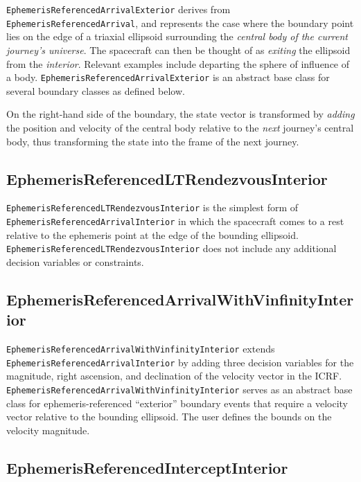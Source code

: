 \texttt{EphemerisReferencedArrivalExterior} derives from \texttt{EphemerisReferencedArrival}, and represents the case where the boundary point lies on the edge of a triaxial ellipsoid surrounding the \textit{central body of the current journey's universe}. The spacecraft can then be thought of as \textit{exiting} the ellipsoid from the \textit{interior}. Relevant examples include departing the sphere of influence of a body. \texttt{EphemerisReferencedArrivalExterior} is an abstract base class for several boundary classes as defined below.

On the right-hand side of the boundary, the state vector is transformed by \textit{adding} the position and velocity of the central body relative to the \textit{next} journey's central body, thus transforming the state into the frame of the next journey.

\subsection{EphemerisReferencedLTRendezvousInterior}
\label{subsubsec:EphemerisReferencedLTRendezvousInterior}

\texttt{EphemerisReferencedLTRendezvousInterior} is the simplest form of \texttt{EphemerisReferencedArrivalInterior} in which the spacecraft comes to a rest relative to the ephemeris point at the edge of the bounding ellipsoid. \texttt{EphemerisReferencedLTRendezvousInterior} does not include any additional decision variables or constraints.

\subsection{EphemerisReferencedArrivalWithVinfinityInterior}
\label{subsubsec:EphemerisReferencedArrivalWithVinfinityInterior}

\texttt{EphemerisReferencedArrivalWithVinfinityInterior} extends \texttt{EphemerisReferencedArrivalInterior} by adding three decision variables for the magnitude, right ascension, and declination of the velocity vector in the ICRF. \texttt{EphemerisReferencedArrivalWithVinfinityInterior} serves as an abstract base class for ephemeris-referenced ``exterior'' boundary events that require a velocity vector relative to the bounding ellipsoid. The user defines the bounds on the velocity magnitude.

\subsection{EphemerisReferencedInterceptInterior}
\label{subsubsec:EphemerisReferencedInterceptInterior}

